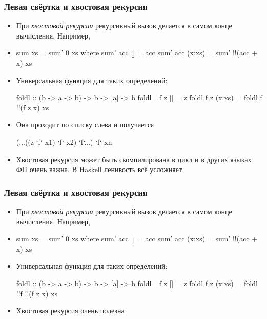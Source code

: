 \documentclass[11pt]{beamer}
\begin{document}
\begin{frame}[fragile]
  \frametitle{Левая свёртка и хвостовая рекурсия}
  \begin{itemize}
    \item При \emph{хвостовой рекурсии} рекурсивный вызов делается в самом конце вычисления. Например,
    \item \begin{haskellsmall}
            sum xs = sum' 0 xs where
              sum' acc [] = acc
              sum' acc (x:xs) = sum' !\pause!(acc + x) xs
          \end{haskellsmall}
    \item Универсальная функция для таких определений:
          \begin{haskellsmall}
            foldl :: (b -> a -> b) -> b -> [a] -> b
            foldl _f z [] = z
            foldl f z (x:xs) = foldl f !\pause!(f z x) xs
          \end{haskellsmall}
    \item Она проходит по списку слева и получается 
          \begin{haskellsmall}
            (...((z `f` x1) `f` x2) `f`...) `f` xn
          \end{haskellsmall}
    \item Хвостовая рекурсия может быть скомпилирована в цикл и в других языках ФП очень важна. В Haskell ленивость всё усложняет.
  \end{itemize}
\end{frame}

\begin{frame}[fragile]
  \frametitle{Левая свёртка и хвостовая рекурсия}
  \begin{itemize}
    \item При \emph{хвостовой рекурсии} рекурсивный вызов делается в самом конце вычисления. Например,
    \item \begin{haskellsmall}
            sum xs = sum' 0 xs
              where
                sum' acc [] = acc
                sum' acc (x:xs) = sum' !\pause!(acc + x) xs
          \end{haskellsmall}
    \item Универсальная функция для таких определений:
          \begin{haskellsmall}
            foldl :: (b -> a -> b) -> b -> [a] -> b
            foldl _f z [] = z
            foldl f z (x:xs) = foldl !\pause!f !\pause!(f z x) xs
          \end{haskellsmall}
    \item Хвостовая рекурсия очень полезна 
  \end{itemize}
\end{frame}
\end{document}
